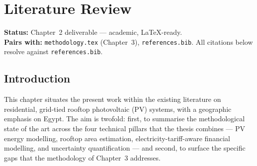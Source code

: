 %
%

\providecommand{\degC}{\,^{\circ}\mathrm{C}}
\providecommand{\COtwo}{\mathrm{CO_{2}}}

\chapter{Literature Review}
\label{ch:litreview}

\noindent\textbf{Status:} Chapter~2 deliverable --- academic, LaTeX-ready.\\
\textbf{Pairs with:} \texttt{methodology.tex} (Chapter~3),
\texttt{references.bib}. All citations below resolve against
\texttt{references.bib}.

\bigskip

\section{Introduction}
\label{sec:litreview-intro}

This chapter situates the present work within the existing literature
on residential, grid-tied rooftop photovoltaic (PV) systems, with a
geographic emphasis on Egypt. The aim is twofold: first, to summarise
the methodological state of the art across the four technical pillars
that the thesis combines --- PV energy modelling, rooftop area
estimation, electricity-tariff-aware financial modelling, and
uncertainty quantification --- and second, to surface the specific
gaps that the methodology of Chapter~3 addresses.

